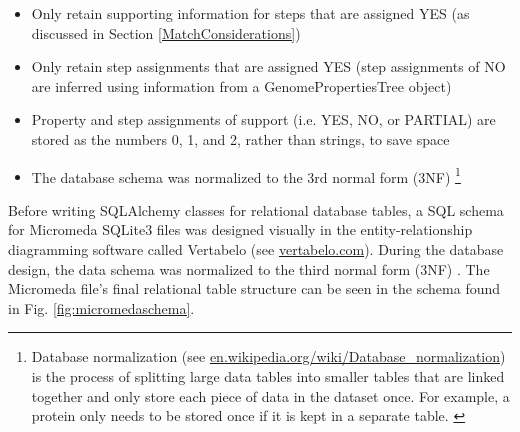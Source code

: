 \begin{itemize}
\item Only retain supporting information for steps that are assigned YES (as discussed in Section \ref{MatchConsiderations})
\item Only retain step assignments that are assigned YES (step assignments of NO are inferred using information from a GenomePropertiesTree object)
\item Property and step assignments of support (i.e. YES, NO, or PARTIAL) are stored as the numbers 0, 1, and 2, rather than strings, to save space
\item The database schema was normalized to the 3rd normal form (3NF) \cite{beeri1989sophisticate} \footnote{Database normalization (see \href{en.wikipedia.org/wiki/Database\_normalization}{en.wikipedia.org/wiki/Database\_normalization}) is the process of splitting large data tables into smaller tables that are linked together and only store each piece of data in the dataset once. For example, a protein only needs to be stored once if it is kept in a separate table. \label{normailization-note}} 
\end{itemize}

Before writing SQLAlchemy classes for relational database tables, a SQL schema for Micromeda SQLite3 files was designed visually in the entity-relationship diagramming software called Vertabelo (see \href{www.vertabelo.com}{vertabelo.com}). During the database design, the data schema was normalized to the third normal form (3NF) \cite{beeri1989sophisticate}. The Micromeda file's final relational table structure can be seen in the schema found in Fig. \ref{fig:micromedaschema}.

